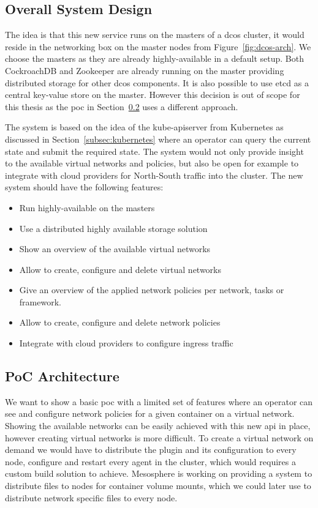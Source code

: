 \subsection{Overall System Design}
\label{subsec:system-design}
The idea is that this new service runs on the masters of a \gls{dcos} cluster, it would reside in the networking box on the master nodes from Figure~\ref{fig:dcos-arch}. We choose the masters as they are already highly-available in a default setup. Both CockroachDB\cite{cockroachdb} and Zookeeper\cite{zookeeper} are already running on the master providing distributed storage for other \gls{dcos} components. It is also possible to use etcd\cite{etcd} as a central key-value store on the master. However this decision is out of scope for this thesis as the \gls{poc} in Section~\ref{subsec:poc-architecture} uses a different approach.

The system is based on the idea of the kube-apiserver from Kubernetes as discussed in Section~\ref{subsec:kubernetes} where an operator can query the current state and submit the required state. The system would not only provide insight to the available virtual networks and policies, but also be open for example to integrate with cloud providers for North-South traffic into the cluster. The new system should have the following features: 
\begin{itemize}
    \item Run highly-available on the masters
    \item Use a distributed highly available storage solution
    \item Show an overview of the available virtual networks
    \item Allow to create, configure and delete virtual networks
    \item Give an overview of the applied network policies per network, tasks or framework.
    \item Allow to create, configure and delete network policies
    \item Integrate with cloud providers to configure ingress traffic
\end{itemize}

\subsection{PoC Architecture}
\label{subsec:poc-architecture}
We want to show a basic \gls{poc} with a limited set of features where an operator can see and configure network policies for a given container on a virtual network. Showing the available networks can be easily achieved with this new \gls{api} in place, however creating virtual networks is more difficult. To create a virtual network on demand we would have to distribute the plugin and its configuration to every node, configure and restart every agent in the cluster, which would requires a custom build solution to achieve. Mesosphere is working on providing a system to distribute files to nodes for container volume mounts, which we could later use to distribute network specific files to every node.

